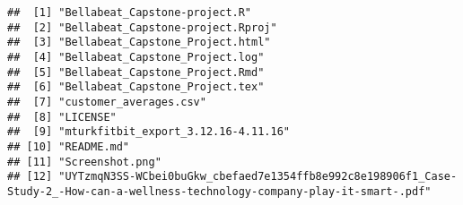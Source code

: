 \documentclass[
]{article}
\newenvironment{Shaded}{\begin{snugshade}}{\end{snugshade}}
\newcommand{\CommentTok}[1]{\textcolor[rgb]{0.56,0.35,0.01}{\textit{#1}}}
\newcommand{\FunctionTok}[1]{\textcolor[rgb]{0.13,0.29,0.53}{\textbf{#1}}}
\newcommand{\NormalTok}[1]{#1}
\newcommand{\OtherTok}[1]{\textcolor[rgb]{0.56,0.35,0.01}{#1}}
\newcommand{\StringTok}[1]{\textcolor[rgb]{0.31,0.60,0.02}{#1}}
\begin{document}
\begin{verbatim}
##  [1] "Bellabeat_Capstone-project.R"                                                                                                  
##  [2] "Bellabeat_Capstone-project.Rproj"                                                                                              
##  [3] "Bellabeat_Capstone_Project.html"                                                                                               
##  [4] "Bellabeat_Capstone_Project.log"                                                                                                
##  [5] "Bellabeat_Capstone_Project.Rmd"                                                                                                
##  [6] "Bellabeat_Capstone_Project.tex"                                                                                                
##  [7] "customer_averages.csv"                                                                                                         
##  [8] "LICENSE"                                                                                                                       
##  [9] "mturkfitbit_export_3.12.16-4.11.16"                                                                                            
## [10] "README.md"                                                                                                                     
## [11] "Screenshot.png"                                                                                                                
## [12] "UYTzmqN3SS-WCbei0buGkw_cbefaed7e1354ffb8e992c8e198906f1_Case-Study-2_-How-can-a-wellness-technology-company-play-it-smart-.pdf"
\end{verbatim}

\begin{Shaded}
\end{Shaded}
\end{document}
